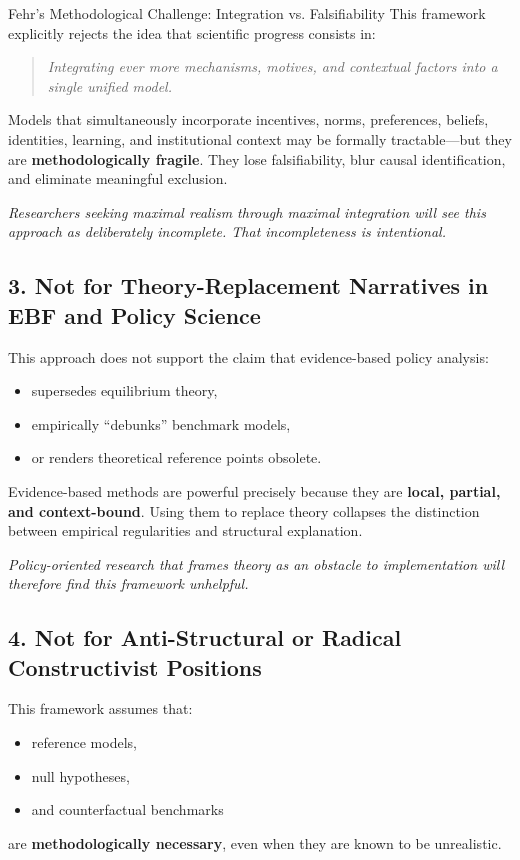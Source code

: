 \begin{chapter}{Fehr's Methodological Challenge: Integration vs. Falsifiability}
This framework explicitly rejects the idea that scientific progress consists in:

\begin{quote}
\textit{Integrating ever more mechanisms, motives, and contextual factors into a single unified model.}
\end{quote}

Models that simultaneously incorporate incentives, norms, preferences, beliefs, identities, learning, and institutional context may be formally tractable---but they are \textbf{methodologically fragile}.
They lose falsifiability, blur causal identification, and eliminate meaningful exclusion.

\textit{Researchers seeking maximal realism through maximal integration will see this approach as deliberately incomplete. That incompleteness is intentional.}

\subsection{3. Not for Theory-Replacement Narratives in EBF and Policy Science}

This approach does not support the claim that evidence-based policy analysis:
\begin{itemize}[noitemsep]
    \item supersedes equilibrium theory,
    \item empirically ``debunks'' benchmark models,
    \item or renders theoretical reference points obsolete.
\end{itemize}

Evidence-based methods are powerful precisely because they are \textbf{local, partial, and context-bound}.
Using them to replace theory collapses the distinction between empirical regularities and structural explanation.

\textit{Policy-oriented research that frames theory as an obstacle to implementation will therefore find this framework unhelpful.}

\subsection{4. Not for Anti-Structural or Radical Constructivist Positions}

This framework assumes that:
\begin{itemize}[noitemsep]
    \item reference models,
    \item null hypotheses,
    \item and counterfactual benchmarks
\end{itemize}
are \textbf{methodologically necessary}, even when they are known to be unrealistic.


\end{chapter}
